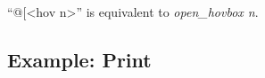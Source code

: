 ``@[<hov n>'' is equivalent to \textit{open\_hovbox n}.

\subsection{Example: Print }
\label{sec:example:-print-}

\inputminted[fontsize=\scriptsize
]{ocaml}{code/format/lambda.ml}








